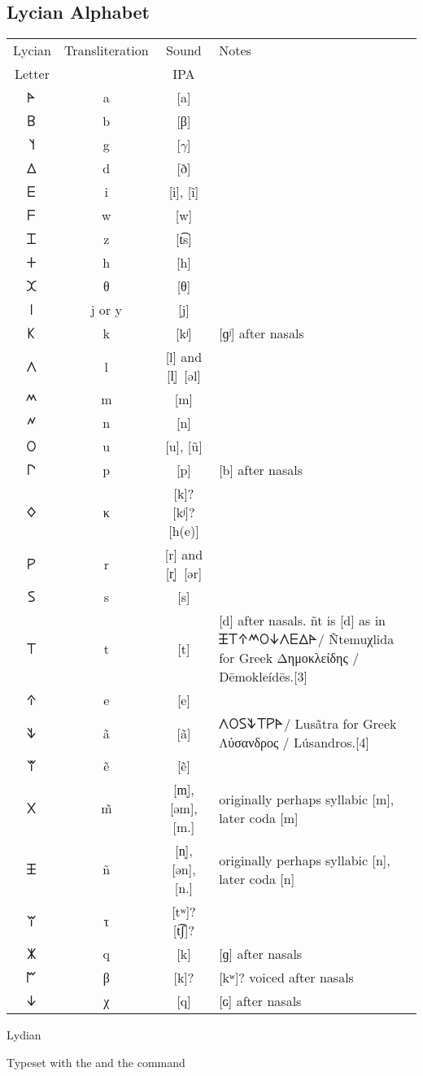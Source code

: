  
\subsection{Lycian Alphabet} 

{\let\a\arial
\begin{longtable}{>{\lycian\Large}c c c p{5.5cm}}
\toprule
\a Lycian &Transliteration	&Sound 	&Notes\\
\a Letter &                  &IPA    &      \\
\midrule
𐊀	&a	&[a]	&\\
\midrule
𐊂	&b	&[β]	&\\
\midrule
𐊄	&g	&[$\gamma$]	&\\
\midrule
𐊅	&d	&[ð]	&\\
\midrule
𐊆	&i	&[i], [ĩ]	&\\
\midrule
𐊇	&w	&[w]	&\\
\midrule
𐊈	&z	&[t͡s]	&\\
\midrule
𐊛	&h	&[h]	&\\
\midrule
𐊉	&θ	&[θ]	&\\
\midrule
𐊊	&j or y	&[j]	&\\
\midrule
𐊋	&k	&[kʲ]	&[ɡʲ] after nasals\\
\midrule
𐊍	&l	&[l] and [l̩]~[əl]	\\
\midrule
𐊎	&m	&[m]	&\\
\midrule
𐊏	&n	&[n]	&\\
\midrule
𐊒	&u	&[u], [ũ] &\\	
\midrule
𐊓	&p	&[p]	  &[b] after nasals\\
\midrule
𐊔	&κ	&[k]? [kʲ]? [h(e)]	&\\
\midrule
𐊕	&r	&[r] and [r̩]~[ər]	&\\
\midrule
𐊖	&s	&[s]	&\\
\midrule
𐊗	&t	&[t]	&[d] after nasals. ñt is [d] as in {\lycian 𐊑𐊗𐊁𐊎𐊒𐊜𐊍𐊆𐊅𐊀}/ Ñtemuχlida for Greek Δημοκλείδης / Dēmokleídēs.[3]\\
\midrule
𐊁	&e	&[e]	&\\
\midrule
𐊙	&ã	&[ã]	& {\lycian 𐊍𐊒𐊖𐊙𐊗𐊕𐊀}/ Lusãtra for Greek Λύσανδρος / Lúsandros.[4]\\
\midrule
𐊚	&ẽ	&[ẽ]	&\\
\midrule
𐊐	&m̃	&[m̩], [əm], [m.]	&originally perhaps syllabic [m], later coda [m]\\
\midrule
𐊑	&ñ	&[n̩], [ən], [n.]	&originally perhaps syllabic [n], later coda [n]\\
\midrule
𐊘	&τ	&[tʷ]? [t͡ʃ]?	&\\
\midrule
𐊌	&q	&[k]	&[ɡ] after nasals\\
\midrule
𐊃	&β	&[k]? &[kʷ]?	voiced after nasals\\
\midrule
𐊜	&χ	&[q]	&[ɢ] after nasals\\
\bottomrule
\end{longtable}
}

 
\begin{scriptexample}[]{Lydian}

Typeset with the  and the command \cmd{\lycian}
\end{scriptexample}






